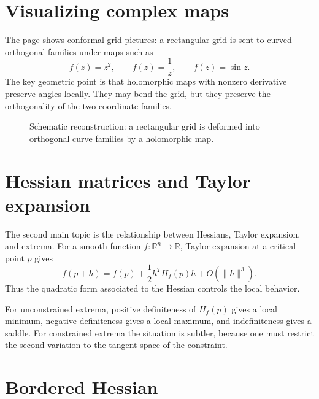 \section{Visualizing complex maps}

The page shows conformal grid pictures: a rectangular grid is sent to curved orthogonal families under maps such as
\[
  f(z)=z^2,\qquad f(z)=\frac1z,\qquad f(z)=\sin z.
\]
The key geometric point is that holomorphic maps with nonzero derivative preserve angles locally.  They may bend the grid, but they preserve the orthogonality of the two coordinate families.

\begin{figure}[H]
\centering
{}
\caption{Schematic reconstruction: a rectangular grid is deformed into orthogonal curve families by a holomorphic map.}
\end{figure}

\section{Hessian matrices and Taylor expansion}

The second main topic is the relationship between Hessians, Taylor expansion, and extrema.  For a smooth function \(f:\mathbb R^n\to\mathbb R\), Taylor expansion at a critical point \(p\) gives
\[
  f(p+h)=f(p)+\frac12 h^T H_f(p)h+O(\|h\|^3).
\]
Thus the quadratic form associated to the Hessian controls the local behavior.

For unconstrained extrema, positive definiteness of \(H_f(p)\) gives a local minimum, negative definiteness gives a local maximum, and indefiniteness gives a saddle.  For constrained extrema the situation is subtler, because one must restrict the second variation to the tangent space of the constraint.

\section{Bordered Hessian}

